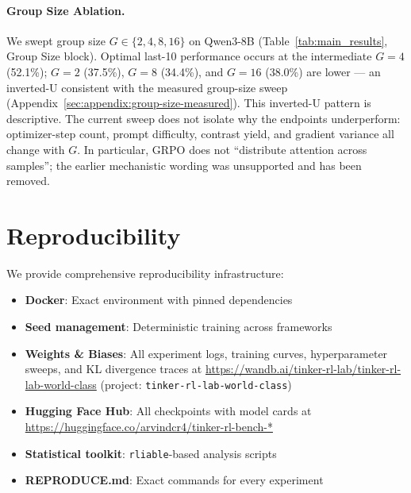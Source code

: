 \documentclass{article}
\begin{document}
\paragraph{Group Size Ablation.}
We swept group size $G \in \{2, 4, 8, 16\}$ on Qwen3-8B (Table~\ref{tab:main_results}, Group Size block).
Optimal last-10 performance occurs at the intermediate $G{=}4$ (52.1\%); $G{=}2$ (37.5\%), $G{=}8$ (34.4\%), and $G{=}16$ (38.0\%) are lower --- an inverted-U consistent with the measured group-size sweep (Appendix~\ref{sec:appendix:group-size-measured}).
This inverted-U pattern is descriptive. The current sweep does not isolate why
the endpoints underperform: optimizer-step count, prompt difficulty, contrast
yield, and gradient variance all change with $G$. In particular, GRPO does not
``distribute attention across samples''; the earlier mechanistic wording was
unsupported and has been removed.

\section{Reproducibility}
\label{sec:reproducibility}

We provide comprehensive reproducibility infrastructure:
\begin{itemize}
    \item \textbf{Docker}: Exact environment with pinned dependencies
    \item \textbf{Seed management}: Deterministic training across frameworks
    \item \textbf{Weights \& Biases}: All experiment logs, training curves,
    hyperparameter sweeps, and KL divergence traces at
    \url{https://wandb.ai/tinker-rl-lab/tinker-rl-lab-world-class}
    (project: \texttt{tinker-rl-lab-world-class})
    \item \textbf{Hugging Face Hub}: All checkpoints with model cards at
    \url{https://huggingface.co/arvindcr4/tinker-rl-bench-*}
    \item \textbf{Statistical toolkit}: \texttt{rliable}-based analysis scripts
    \item \textbf{REPRODUCE.md}: Exact commands for every experiment
\end{itemize}
\end{document}
